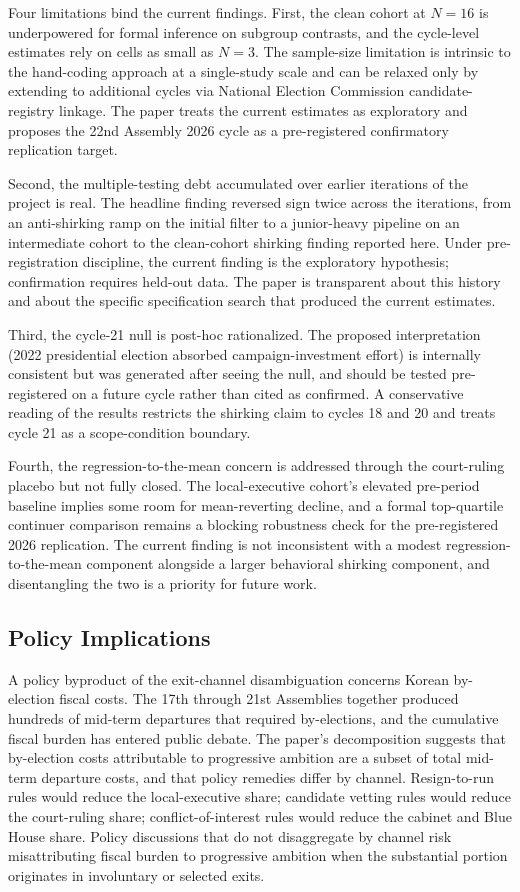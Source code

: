 \documentclass[11pt]{article}
\begin{document}
Four limitations bind the current findings. First, the clean cohort at $N=16$ is underpowered for formal inference on subgroup contrasts, and the cycle-level estimates rely on cells as small as $N=3$. The sample-size limitation is intrinsic to the hand-coding approach at a single-study scale and can be relaxed only by extending to additional cycles via National Election Commission candidate-registry linkage. The paper treats the current estimates as exploratory and proposes the 22nd Assembly 2026 cycle as a pre-registered confirmatory replication target.

Second, the multiple-testing debt accumulated over earlier iterations of the project is real. The headline finding reversed sign twice across the iterations, from an anti-shirking ramp on the initial filter to a junior-heavy pipeline on an intermediate cohort to the clean-cohort shirking finding reported here. Under pre-registration discipline, the current finding is the exploratory hypothesis; confirmation requires held-out data. The paper is transparent about this history and about the specific specification search that produced the current estimates.

Third, the cycle-21 null is post-hoc rationalized. The proposed interpretation (2022 presidential election absorbed campaign-investment effort) is internally consistent but was generated after seeing the null, and should be tested pre-registered on a future cycle rather than cited as confirmed. A conservative reading of the results restricts the shirking claim to cycles 18 and 20 and treats cycle 21 as a scope-condition boundary.

Fourth, the regression-to-the-mean concern is addressed through the court-ruling placebo but not fully closed. The local-executive cohort's elevated pre-period baseline implies some room for mean-reverting decline, and a formal top-quartile continuer comparison remains a blocking robustness check for the pre-registered 2026 replication. The current finding is not inconsistent with a modest regression-to-the-mean component alongside a larger behavioral shirking component, and disentangling the two is a priority for future work.

\subsection{Policy Implications}

A policy byproduct of the exit-channel disambiguation concerns Korean by-election fiscal costs. The 17th through 21st Assemblies together produced hundreds of mid-term departures that required by-elections, and the cumulative fiscal burden has entered public debate. The paper's decomposition suggests that by-election costs attributable to progressive ambition are a subset of total mid-term departure costs, and that policy remedies differ by channel. Resign-to-run rules would reduce the local-executive share; candidate vetting rules would reduce the court-ruling share; conflict-of-interest rules would reduce the cabinet and Blue House share. Policy discussions that do not disaggregate by channel risk misattributing fiscal burden to progressive ambition when the substantial portion originates in involuntary or selected exits.
\end{document}
